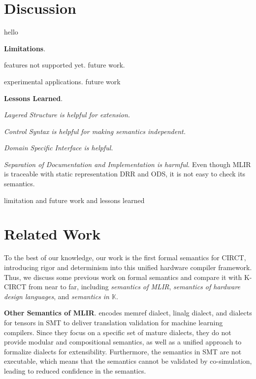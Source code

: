 \section{Discussion}

hello 

\smallskip
\textbf{Limitations}. 

features not supported yet. future work.

experimental applications. future work


\smallskip
\textbf{Lessons Learned}.

\smallskip
\textit{Layered Structure is helpful for extension.}

\smallskip
\textit{Control Syntax is helpful for making semantics independent.}

\smallskip
\textit{Domain Specific Interface is helpful.}

\smallskip
\textit{Separation of Documentation and Implementation is harmful.} Even though MLIR is traceable with static representation DRR and ODS, it is not easy to check its semantics. 

limitation and future work and lessons learned

\section{Related Work}

To the best of our knowledge, our work is the first formal semantics for CIRCT, introducing rigor and determinism into this unified hardware compiler framework. Thus, we discuss some previous work on formal semantics and compare it with K-CIRCT from near to far, including \textit{semantics of MLIR}, \textit{semantics of hardware design languages}, and \textit{semantics in $\mathbb{K}$}.

\smallskip
\textbf{Other Semantics of MLIR}. \citet{bangSMTBasedTranslationValidation2022} encodes memref dialect, linalg dialect, and dialects for tensors in SMT to deliver translation validation for machine learning compilers. Since they focus on a specific set of mature dialects, they do not provide modular and compositional semantics, as well as a unified approach to formalize dialects for extensibility. Furthermore, the semantics in SMT are not executable, which means that the semantics cannot be validated by co-simulation, leading to reduced confidence in the semantics. 


